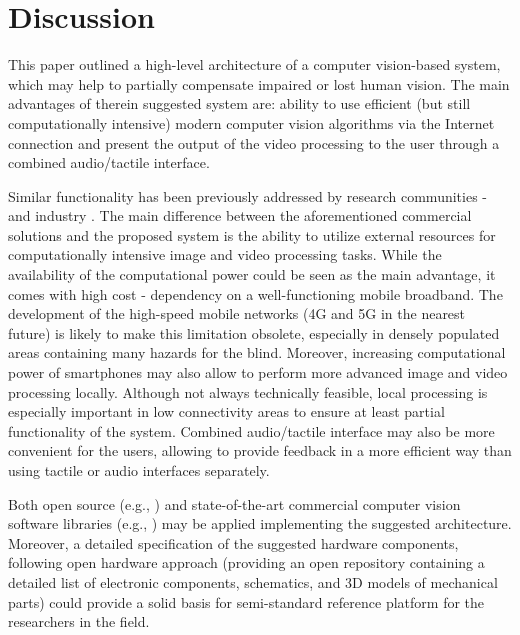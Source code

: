 \documentclass[10pt,conference,compsocconf]{IEEEtran}
\begin{document}
 
\section{Discussion}
\label{sec:discussion}


This paper outlined a high-level architecture of a computer vision-based system, which may help to partially compensate impaired or lost human vision. The main advantages of therein suggested system are: ability to use efficient (but still computationally intensive) modern computer vision algorithms via the Internet connection and present the output of the video processing to the user through a combined audio/tactile interface. 

Similar functionality has been previously addressed by research communities \cite{Caraiman}-\cite{Zientara} and industry \cite{orcam}\cite{horus}. The main difference between the aforementioned commercial solutions and the proposed system is the ability to utilize external resources for computationally intensive image and video processing tasks. While the availability of the computational power could be seen as the main advantage, it comes with high cost - dependency on a well-functioning mobile broadband. The development of the high-speed mobile networks (4G and 5G in the nearest future) is likely to make this limitation obsolete, especially in densely populated areas containing many hazards for the blind. Moreover, increasing computational power of smartphones may also allow to perform more advanced image and video processing locally. Although not always technically feasible, local  processing is especially important in low connectivity areas to ensure at least partial functionality of the system. Combined audio/tactile interface may also be more convenient for the users, allowing to provide feedback in a more efficient way than using tactile or audio interfaces separately. 

Both open source (e.g., \cite{Tensorflow}) and state-of-the-art commercial computer vision software libraries (e.g., \cite{Verilook}) may be applied implementing the suggested architecture. Moreover, a detailed specification of the suggested hardware components, following open hardware approach (providing an open repository containing a detailed list of electronic components, schematics, and 3D models of mechanical parts) could provide a solid basis for semi-standard reference platform for the researchers in the field.
\end{document}
